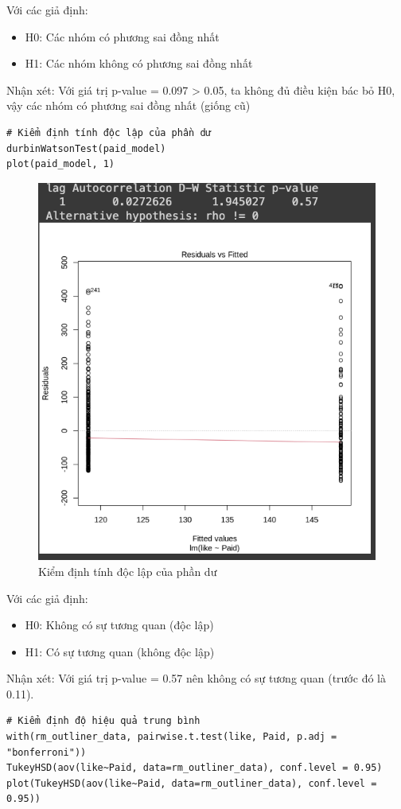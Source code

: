 \begin{itemize}
\begin{lstlisting}
    \end{lstlisting}
    Với các giả định:
    \begin{itemize}
        \item H0: Các nhóm có phương sai đồng nhất
        \item H1: Các nhóm không có phương sai đồng nhất
    \end{itemize}
    Nhận xét: Với giá trị p-value = 0.097 > 0.05, ta không đủ điều kiện bác bỏ H0, vậy các nhóm có phương sai đồng nhất (giống cũ)
\begin{lstlisting}
# Kiểm định tính độc lập của phần dư
durbinWatsonTest(paid_model)
plot(paid_model, 1)
\end{lstlisting}
\begin{figure}[H]
    \centering
    \includegraphics[width=0.8\linewidth]{part23_figures/31.png}
    \caption{Kiểm định tính độc lập của phần dư}
    \label{fig:Kiểm định tính độc lập của phần dư_}
\end{figure}
    Với các giả định:
    \begin{itemize}
        \item H0: Không có sự tương quan (độc lập)
        \item H1: Có sự tương quan (không độc lập)
    \end{itemize}
    Nhận xét: Với giá trị p-value = 0.57 nên không có sự tương quan (trước đó là 0.11).

\begin{lstlisting}
# Kiểm định độ hiệu quả trung bình
with(rm_outliner_data, pairwise.t.test(like, Paid, p.adj = "bonferroni"))
TukeyHSD(aov(like~Paid, data=rm_outliner_data), conf.level = 0.95)
plot(TukeyHSD(aov(like~Paid, data=rm_outliner_data), conf.level = 0.95))


\end{lstlisting}
\end{itemize}
